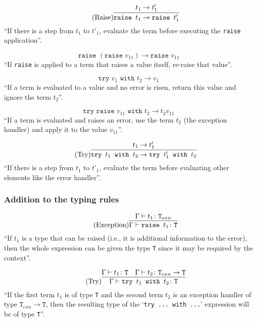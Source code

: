 \begin{equation*}
    \tag{Raise}
    \infer{
        \texttt{raise } t_1 \rightarrow \texttt{raise } t'_1
    }{
        t_1 \rightarrow t'_1
    }
\end{equation*}
``If there is a step from $t_1$ to $t'_1$, evaluate the term
before executing the \texttt{raise} application''.

\begin{equation*}
    \tag{Re-Raise}
    \texttt{raise } (\texttt{raise } v_{11}) \rightarrow \texttt{raise } v_{11}
\end{equation*}
``If \texttt{raise} is applied to a term that raises a value itself, re-raise that
value''.

\begin{equation*}
    \tag{Try Value}
    \texttt{try } v_1 \texttt{ with } t_2 \rightarrow v_1
\end{equation*}
``If a term is evaluated to a value and no error is risen, return
this value and ignore the term $t_2$''.

\begin{equation*}
    \tag{Try Error}
    \texttt{try } \texttt{raise } v_{11} \texttt{ with } t_2 \rightarrow t_2 v_{11}
\end{equation*}
``If a term is evaluated and raises an error, use the term $t_2$ (the exception
handler) and apply it to the value $v_{11}$''.

\begin{equation*}
    \tag{Try}
    \infer{
        \texttt{try } t_1 \texttt{ with } t_2 \rightarrow \texttt{try } t'_1 \texttt{ with } t_2
    }{
        t_1 \rightarrow t'_1
    }
\end{equation*}
``If there is a step from $t_1$ to $t'_1$, evaluate the term
before evaluating other elements like the error handler''.

\subsubsection{Addition to the typing rules \cite{pierce2002ProgLang}}
\begin{equation*}
    \tag{Exception}
    \infer{
        \Gamma \vdash \texttt{raise } t_1 \colon \texttt{T}
    }{
        \Gamma \vdash t_1 \colon \texttt{T}_{exn}
    }
\end{equation*}
``If $t_1$ is a type that can be raised (i.e., it is
additional information to the error), then the whole
expression can be given the type \texttt{T} since it may be required
by the context''.

\begin{equation*}
    \tag{Try}
    \infer{
        \Gamma \vdash \texttt{try } t_1 \texttt{ with } t_2 \colon \texttt{T}
    }{
        \Gamma \vdash t_1 \colon \texttt{T}
        &
        \Gamma \vdash t_2 \colon \texttt{T}_{exn} \rightarrow \texttt{T}
    }
\end{equation*}
``If the first term $t_1$ is of type \texttt{T} and the second
term $t_2$ is an exception handler of type $\texttt{T}_{exn} \rightarrow \texttt{T}$,
then the resulting type of the `\texttt{try ... with ...}' expression will
be of type \texttt{T}''.
